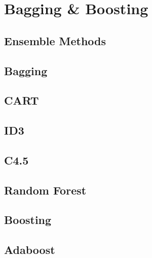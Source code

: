 
\chapter{Bagging \& Boosting}
\label{chapter10}

\section{Ensemble Methods}

\section{Bagging}

\section{CART}

\section{ID3}

\section{C4.5}

\section{Random Forest}

\section{Boosting}

\section{Adaboost}